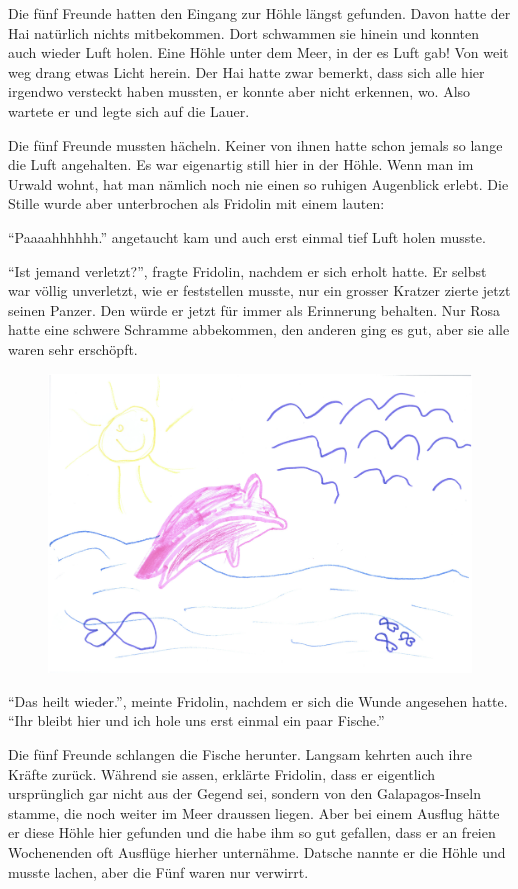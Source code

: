 Die fünf Freunde hatten den Eingang zur Höhle längst gefunden. Davon hatte der Hai natürlich nichts mitbekommen. Dort schwammen sie hinein und konnten auch wieder Luft holen. Eine Höhle unter dem Meer, in der es Luft gab! Von weit weg drang etwas Licht herein. Der Hai hatte zwar bemerkt, dass sich alle hier irgendwo versteckt haben mussten, er konnte aber nicht erkennen, wo. Also wartete er und legte sich auf die Lauer.

Die fünf Freunde mussten hächeln. Keiner von ihnen hatte schon jemals so lange die Luft angehalten. Es war eigenartig still hier in der Höhle. Wenn man im Urwald wohnt, hat man nämlich noch nie einen so ruhigen Augenblick erlebt. Die Stille wurde aber unterbrochen als Fridolin mit einem lauten: 

\enquote{Paaaahhhhhh.} angetaucht kam und auch erst einmal tief Luft holen musste.

\enquote{Ist jemand verletzt?}, fragte Fridolin, nachdem er sich erholt hatte. Er selbst war völlig unverletzt, wie er feststellen musste, nur ein grosser Kratzer zierte jetzt seinen Panzer. Den würde er jetzt für immer als Erinnerung behalten. Nur Rosa hatte eine schwere Schramme abbekommen, den anderen ging es gut, aber sie alle waren sehr erschöpft.

\begin{figure}[h]
\centering
\includegraphics[width=\textwidth]{bilder/oma1.pdf}
\end{figure}
\enquote{Das heilt wieder.}, meinte Fridolin, nachdem er sich die Wunde angesehen hatte. \enquote{Ihr bleibt hier und ich hole uns erst einmal ein paar Fische.}

Die fünf Freunde schlangen die Fische herunter. Langsam kehrten auch ihre Kräfte zurück. Während sie assen, erklärte Fridolin, dass er eigentlich ursprünglich gar nicht aus der Gegend sei, sondern von den Galapagos-Inseln stamme, die noch weiter im Meer draussen liegen. Aber bei einem Ausflug hätte er diese Höhle hier gefunden und die habe ihm so gut gefallen, dass er an freien Wochenenden oft Ausflüge hierher unternähme. Datsche nannte er die Höhle und musste lachen, aber die Fünf waren nur verwirrt. 

